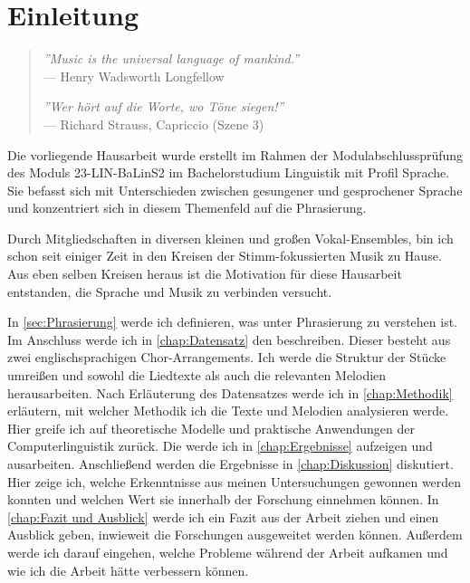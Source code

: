 \chapter{Einleitung}
\label{chap:Einleitung}


\begin{quote}
\textit{''Music is the universal language of mankind.''}
\\--- Henry Wadsworth Longfellow

\textit{''Wer hört auf die Worte, wo Töne siegen!''} 
\\--- Richard Strauss, Capriccio (Szene 3)
\end{quote}

\vspace{1cm}

Die vorliegende Hausarbeit wurde erstellt im Rahmen der Modulabschlussprüfung des Moduls 23-LIN-BaLinS2 im Bachelorstudium Linguistik mit Profil Sprache. Sie befasst sich mit Unterschieden zwischen gesungener und gesprochener Sprache und konzentriert sich in diesem Themenfeld auf die Phrasierung.

Durch Mitgliedschaften in diversen kleinen und großen Vokal-Ensembles, bin ich schon seit einiger Zeit in den Kreisen der Stimm-fokussierten Musik zu Hause. Aus eben selben Kreisen heraus ist die Motivation für diese Hausarbeit entstanden, die Sprache und Musik zu verbinden versucht.

In \autoref{sec:Phrasierung} werde ich definieren, was unter Phrasierung zu verstehen ist.
Im Anschluss werde ich in \autoref{chap:Datensatz} den  beschreiben. Dieser besteht aus zwei englischsprachigen Chor-Arrangements. Ich werde die Struktur der Stücke umreißen und sowohl die Liedtexte als auch die relevanten Melodien herausarbeiten.
Nach Erläuterung des Datensatzes werde ich in \autoref{chap:Methodik} erläutern, mit welcher Methodik ich die Texte und Melodien analysieren werde. Hier greife ich auf theoretische Modelle und praktische Anwendungen der Computerlinguistik zurück.
Die  werde ich in \autoref{chap:Ergebnisse} aufzeigen und ausarbeiten.
Anschließend werden die Ergebnisse in \autoref{chap:Diskussion} diskutiert. Hier zeige ich, welche Erkenntnisse aus meinen Untersuchungen gewonnen werden konnten und welchen Wert sie innerhalb der Forschung einnehmen können.
In \autoref{chap:Fazit und Ausblick} werde ich ein Fazit aus der Arbeit ziehen und einen Ausblick geben, inwieweit die Forschungen ausgeweitet werden können. Außerdem werde ich darauf eingehen, welche Probleme während der Arbeit aufkamen und wie ich die Arbeit hätte verbessern können.


